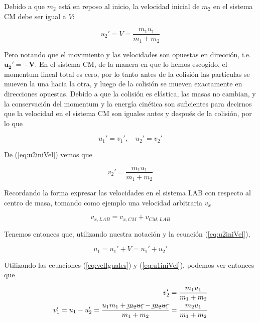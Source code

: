 \documentclass[a4paper,10pt]{article}
\begin{document}
Debido a que $m_2$ está en reposo al inicio, la velocidad inicial de $m_2$ en el sistema
CM debe ser igual a $V$:

\begin{equation}
u_2'= V = \frac{m_1 u_1}{m_1+m_2}
 \label{eq:u2iniVel}
 \end{equation}
  
Pero notando que el movimiento y las velocidades son opuestas en dirección, i.e. $\mathbf{u_2'=-\mathbf{V}}$.
En el sistema CM, de la manera en que lo hemos escogido, el momentum lineal total es cero, por lo tanto
antes de la colisión las partículas se mueven la una hacia la otra, y luego de la colisión
se mueven exactamente en direcciones opuestas. Debido a que la colisión es elástica,
las masas no cambian, y la conservación del momentum y la energía cinética son suficientes
para decirnos que la velocidad en el sistema CM son iguales antes y después de la colisión,
por lo que 

\begin{equation}
 u_1'=v_1', \quad u_2'=v_2'
 \label{eq:velIguales}
\end{equation}

De (\ref{eq:u2iniVel}) vemos que 

\begin{equation}
v_2'= \frac{m_1 u_1}{m_1+m_2}
 \label{eq:u2finalVel} 
\end{equation}

Recordando la forma expresar las velocidades en el sistema LAB con respecto al centro de masa,
tomando como ejemplo una velocidad arbitraria $v_x$

$$
v_{x,LAB} = v_{x,CM} + v_{CM,LAB}
$$

Tenemos entonces que, utilizando nuestra notación y la ecuación (\ref{eq:u2iniVel}),

\begin{equation}
 u_1 = u_1' + V = u_1' + u_2'
 \label{eq:u1iniVel}
\end{equation}

Utilizando las ecuaciones (\ref{eq:velIguales}) y (\ref{eq:u1iniVel}), podemos ver entonces que 

 \begin{gather}
 \begin{split}
   v_2' = \frac{m_1 u_1}{m_1 + m_2} \\
   v_1' = u_1 - u_2' = \frac{u_1 m_1 + \cancel{m_2 u_1} - \cancel{m_2 u_1}}{m_1 + m_2} =
   \frac{m_2 u_1}{m_1 + m_2}\\
   \label{eq:velFinales}
 \end{split}
 \end{gather}
\end{document}
